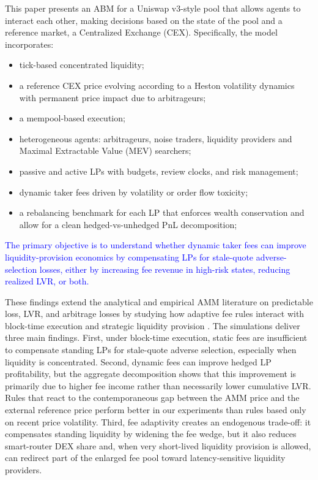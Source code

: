 \documentclass[11pt]{article}
\begin{document}
This paper presents an ABM for a Uniswap v3-style pool that allows agents to interact each other, making decisions based 
on the state of the pool and a reference market, a Centralized Exchange (CEX). Specifically, the model incorporates:
\begin{itemize}[leftmargin=*]
  \item tick-based concentrated liquidity;
  \item a reference CEX price evolving according to a Heston volatility dynamics with permanent price impact due 
  to arbitrageurs;
  \item a mempool-based execution;
  \item heterogeneous agents: arbitrageurs, noise traders, liquidity providers and Maximal Extractable Value (MEV) searchers;
  \item passive and active LPs with budgets, review clocks, and risk management;
  \item dynamic taker fees driven by volatility or order flow toxicity;
  \item a rebalancing benchmark for each LP that enforces wealth conservation and allow for a clean hedged-vs-unhedged 
  PnL decomposition;
\end{itemize}

\textcolor{blue}{The primary objective is to understand whether dynamic taker fees can improve liquidity-provision economics by compensating LPs for stale-quote adverse-selection losses, either by increasing fee revenue in high-risk states, reducing realized LVR, or both.}

These findings extend the analytical and empirical AMM literature on predictable loss, LVR, and arbitrage losses by studying
how adaptive fee rules interact with block-time execution and strategic liquidity provision
\cite{milionis2023,CARTEA2025105134,fritsch2024}. The simulations deliver three main findings. First, under block-time execution, static fees are insufficient to compensate
standing LPs for stale-quote adverse selection, especially when liquidity is concentrated. Second, dynamic fees can improve
hedged LP profitability, but the aggregate decomposition shows that this improvement is primarily due to higher fee income
rather than necessarily lower cumulative LVR. Rules that react to the contemporaneous gap between the AMM price and the
external reference price perform better in our experiments than rules based only on recent price volatility. Third, fee
adaptivity creates an endogenous trade-off: it compensates standing liquidity by widening the fee wedge, but it also
reduces smart-router DEX share and, when very short-lived liquidity provision is allowed, can redirect part of the enlarged
fee pool toward latency-sensitive liquidity providers.
\end{document}
